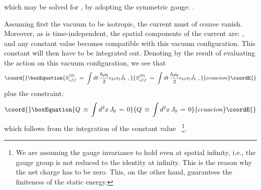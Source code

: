 \documentclass[a4paper,12pt]{article} \tolerance=200
\begin{document}
which may be solved for \coordHE{}, by adopting the symmetric gauge:
\mbox{\coordHE{}}.

Assuming first the vacuum to be isotropic, the current \coordHE{}
must of course vanish. Moreover, as \coordHE{} is time-independent,
the spatial components of the current are: \coordHE{}, and any constant \coordHE{} value becomes compatible with
this vacuum configuration.  This constant will then have to be
integrated out. Denoting by \coordHE{} the result of evaluating
the action on this vacuum configuration, we see that
\begin{equation}\coord{}\boxEquation{\label{eq:s0eff}
S^{(0)}_{eff} \;=\; \int dt \, \frac{h \rho_0}{2} \epsilon_{kl} x_l {\tilde J}_k  \;,
}{S^{(0)}_{eff} \;=\; \int dt \, \frac{h \rho_0}{2} \epsilon_{kl} x_l {\tilde J}_k  \;,
}{ecuacion}\coordE{}\end{equation}
plus the constraint:
\begin{equation}\coord{}\boxEquation{\label{eq:constraint}
Q \,\equiv\, \int d^2x \, J_0 \,=\, 0
}{Q \,\equiv\, \int d^2x \, J_0 \,=\, 0
}{ecuacion}\coordE{}\end{equation}
which follows from the integration of the constant value
\coordHE{}~\footnote{We are assuming the gauge invariance to hold even at
spatial infinity, i.e., the gauge group is not reduced to the
identity at infinity. This is the reason why the net charge has
to be zero. This, on the other hand, guarantees the finiteness of
the static energy.}.
\end{document}
